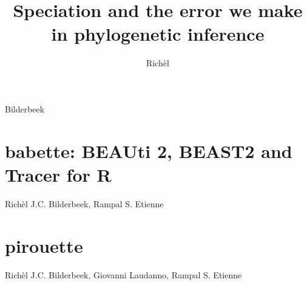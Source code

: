 \documentclass[]{dissertation}
\begin{document}
\title{Speciation and the error we make in phylogenetic inference}
\author{Richèl}{Bilderbeek}

\frontmatter



\tableofcontents

\mainmatter

\thumbtrue







\chapter{babette: BEAUti 2, BEAST2 and Tracer for R}
\label{chapter_babette}
Rich\`el J.C. Bilderbeek, Rampal S. Etienne
\newpage



\chapter{pirouette}
\label{chapter_pirouette}
Rich\`el J.C. Bilderbeek, Giovanni Laudanno, Rampal S. Etienne
\newpage





%
\end{document}
